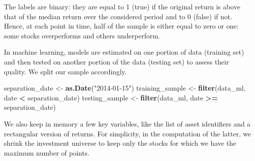 \documentclass[]{krantz}
\makeatletter
\newenvironment{Shaded}{\begin{snugshade}}{\end{snugshade}}
\newcommand{\KeywordTok}[1]{\textcolor[rgb]{0.27,0.27,0.27}{\textbf{#1}}}
\newcommand{\NormalTok}[1]{#1}
\newcommand{\OperatorTok}[1]{\textcolor[rgb]{0.43,0.43,0.43}{\textbf{#1}}}
\newcommand{\StringTok}[1]{\textcolor[rgb]{0.5,0.5,0.5}{#1}}
\newenvironment{kframe}{%
\medskip{}
\setlength{\fboxsep}{.8em}
 \def\at@end@of@kframe{}%
 \ifinner\ifhmode%
  \def\at@end@of@kframe{\end{minipage}}%
  \begin{minipage}{\columnwidth}%
 \fi\fi%
 \def\FrameCommand##1{\hskip\@totalleftmargin \hskip-\fboxsep
 \colorbox{shadecolor}{##1}\hskip-\fboxsep
     \hskip-\linewidth \hskip-\@totalleftmargin \hskip\columnwidth}%
 \MakeFramed {\advance\hsize-\width
   \@totalleftmargin\z@ \linewidth\hsize
   \@setminipage}}%
 {\par\unskip\endMakeFramed%
 \at@end@of@kframe}
\renewenvironment{Shaded}{\begin{kframe}}{\end{kframe}}
\theoremstyle{definition}
\theoremstyle{definition}
\theoremstyle{definition}
\theoremstyle{remark}
\makeatother
\begin{document}
\normalsize

The labels are binary: they are equal to 1 (true) if the original return
is above that of the median return over the considered period and to 0
(false) if not. Hence, at each point in time, half of the sample is
either equal to zero or one: some stocks overperforms and others
underperform.

In machine learning, models are estimated on one portion of data
(training set) and then tested on another portion of the data (testing
set) to assess their quality. We split our sample accordingly.

\footnotesize

\begin{Shaded}
\begin{Highlighting}[]
\NormalTok{separation_date <-}\StringTok{ }\KeywordTok{as.Date}\NormalTok{(}\StringTok{"2014-01-15"}\NormalTok{)}
\NormalTok{training_sample <-}\StringTok{ }\KeywordTok{filter}\NormalTok{(data_ml, date }\OperatorTok{<}\StringTok{ }\NormalTok{separation_date)}
\NormalTok{testing_sample <-}\StringTok{ }\KeywordTok{filter}\NormalTok{(data_ml, date }\OperatorTok{>=}\StringTok{ }\NormalTok{separation_date)}
\end{Highlighting}
\end{Shaded}

\normalsize

We also keep in memory a few key variables, like the list of asset
identifiers and a rectangular version of returns. For simplicity, in the
computation of the latter, we shrink the investment universe to keep
only the stocks for which we have the maximum number of points.

\footnotesize
\end{document}
